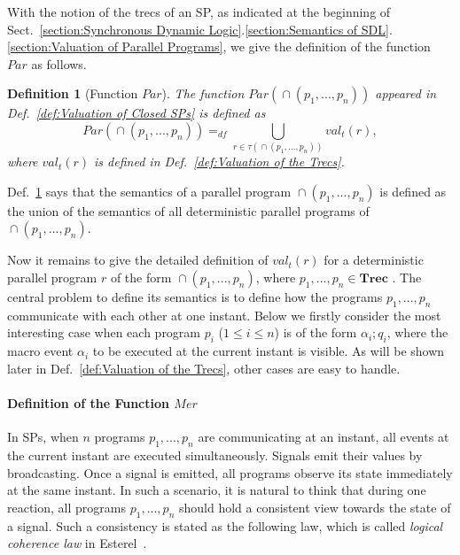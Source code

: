 \documentclass{fcs}
\newtheorem{mydef}{Definition}[section]
\newcommand{\bff}[1]{\mathbf{#1}}
\newcommand{\val}[0]{\mathit{val}}
\newcommand{\Par}[0]{\mathit{Par}}
\DeclareMathOperator{\seq}{;}
\DeclareMathOperator{\para}{\cap}
\newcommand{\Trec}[0]{\bff{Trec}}
\newcommand{\valt}[0]{\val_t}
\newcommand{\Merge}[0]{\mathit{Mer}}
\newcommand{\dddef}[0]{=_{df}}
\begin{document}
With the notion of the trecs of an SP, as indicated at the beginning of Sect.~\ref{section:Synchronous Dynamic Logic}.\ref{section:Semantics of SDL}.\ref{section:Valuation of Parallel Programs},
we give the definition of the function $\Par$ as follows.

\begin{mydef}[Function $\Par$]
	\label{def:Par}
	The function $\Par(\para(p_1,...,p_n))$ appeared in Def.~\ref{def:Valuation of Closed SPs} is defined as
	$$\Par(\para(p_1,...,p_n))\dddef  \bigcup_{r\in \tau(\para(p_1,...,p_n))} \valt(r), $$
where $\valt(r)$ is defined in Def.~\ref{def:Valuation of the Trecs}.
\end{mydef}

Def.~\ref{def:Par} says that the semantics of a parallel program $\para(p_1,...,p_n)$ is defined as the union of the semantics of all deterministic parallel programs of $\para(p_1,...,p_n)$.

Now it remains to give the detailed definition of $\valt(r)$ for a deterministic parallel program $r$ of the form $\para(p_1,...,p_n)$, where $p_1,...,p_n\in\Trec$ .
The central problem to define its semantics is to define how the programs $p_1,...,p_n$ communicate with each other at one instant.
Below we firstly consider the most interesting case when each program $p_i$ ($1\le i\le n$) is of the form $\alpha_i \seq q_i$, where the macro event $\alpha_i$ to be executed at the current instant is visible.
As will be shown later in Def.~\ref{def:Valuation of the Trecs}, other cases are easy to handle.


\paragraph{Definition of the Function $\Merge$}
In SPs, when $n$ programs $p_1,...,p_n$ are communicating at an instant, all events at the current instant are executed simultaneously. %
Signals emit their values by broadcasting. Once a signal is emitted, all programs observe its state immediately at the same instant.
In such a scenario, it is natural to think that during one reaction, all programs $p_1,...,p_n$ should hold a consistent view towards the state of a signal.
Such a consistency is stated as the following law, which is called \emph{logical coherence law} in Esterel~\cite{Berry99}.
\end{document}

